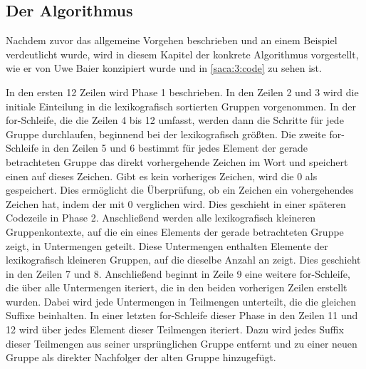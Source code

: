 \newpage
\subsection{Der Algorithmus}
\label{gsaca:chapter4}
%
Nachdem zuvor das allgemeine Vorgehen beschrieben und an einem Beispiel verdeutlicht wurde, wird in diesem Kapitel der konkrete Algorithmus vorgestellt, wie er von Uwe Baier konzipiert wurde und in \ref{saca:3:code} zu sehen ist. 

In den ersten 12 Zeilen wird Phase 1 beschrieben. In den Zeilen 2 und 3 wird die initiale Einteilung in die lexikografisch sortierten Gruppen vorgenommen. In der for-Schleife, die die Zeilen 4 bis 12 umfasst, werden dann die Schritte f{\"u}r jede Gruppe durchlaufen, beginnend bei der lexikografisch gr{\"o}{\ss}ten. Die zweite for-Schleife in den Zeilen 5 und 6 bestimmt f{\"u}r jedes Element der gerade betrachteten Gruppe das direkt vorhergehende Zeichen im Wort und speichert einen \prevpointer auf dieses Zeichen. Gibt es kein vorheriges Zeichen, wird die 0 als \prevpointer gespeichert. Dies erm{\"o}glicht die {\"U}berpr{\"u}fung, ob ein Zeichen ein vohergehendes Zeichen hat, indem der \prevpointer mit 0 verglichen wird. Dies geschieht in einer sp{\"a}teren Codezeile in Phase 2. Anschlie{\ss}end werden alle lexikografisch kleineren Gruppenkontexte, auf die ein \prevpointer eines Elements der gerade betrachteten Gruppe zeigt, in Untermengen geteilt. 
Diese Untermengen enthalten Elemente der lexikografisch kleineren Gruppen, auf die dieselbe Anzahl an \prevpointern zeigt.
Dies geschieht in den Zeilen 7 und 8. 
Anschlie{\ss}end beginnt in Zeile 9 eine weitere for-Schleife, die {\"u}ber alle Untermengen iteriert, die in den beiden vorherigen Zeilen erstellt wurden. 
Dabei wird jede Untermengen in Teilmengen unterteilt, die die gleichen Suffixe beinhalten. 
In einer letzten for-Schleife dieser Phase in den Zeilen 11 und 12 wird {\"u}ber jedes Element dieser Teilmengen iteriert. 
Dazu wird jedes Suffix dieser Teilmengen aus seiner urspr{\"u}nglichen Gruppe entfernt und zu einer neuen Gruppe als direkter Nachfolger der alten Gruppe hinzugef{\"u}gt.


